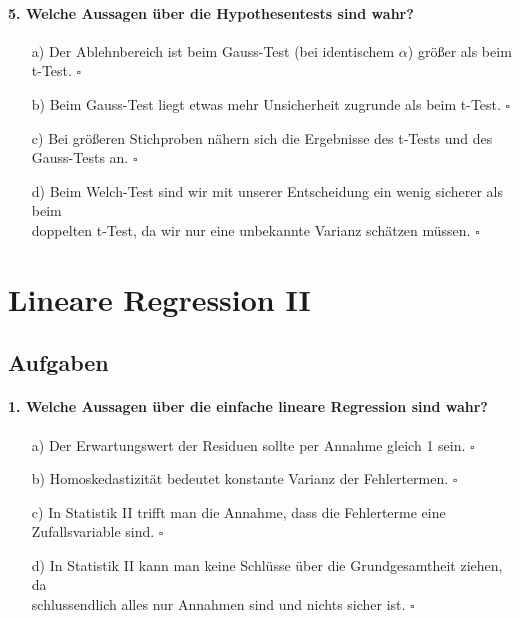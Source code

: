\documentclass[a4paper]{article}
\begin{document}
 \paragraph{5. Welche Aussagen über die Hypothesentests sind wahr?} \begin{itemize}
    \item[a)] Der Ablehnbereich ist beim Gauss-Test (bei identischem $\alpha$) größer als beim t-Test. \hfill $\square$
    \item[b)] Beim Gauss-Test liegt etwas mehr Unsicherheit zugrunde als beim t-Test. \hfill $\square$
    \item[c)] Bei größeren Stichproben nähern sich die Ergebnisse des t-Tests und des Gauss-Tests an. \hfill $\square$
    \item[d)] Beim Welch-Test sind wir mit unserer Entscheidung ein wenig sicherer als beim \\doppelten t-Test, da wir nur eine unbekannte Varianz schätzen müssen. \hfill $\square$
 \end{itemize}  


\clearpage


\section{Lineare Regression II}\label{chap:mult-reg}

\subsection{Aufgaben}
\paragraph{1. Welche Aussagen über die einfache lineare Regression sind wahr?}
\begin{itemize}
    \item[a)] Der Erwartungswert der Residuen sollte per Annahme gleich 1 sein. \hfill $\square$
    \item[b)] Homoskedastizität bedeutet konstante Varianz der Fehlertermen. \hfill $\square$
    \item[c)] In Statistik II trifft man die Annahme, dass die Fehlerterme eine Zufallsvariable sind. \hfill $\square$
    \item[d)] In Statistik II kann man keine Schlüsse über die Grundgesamtheit ziehen, da\\ schlussendlich alles nur Annahmen sind und nichts sicher ist. \hfill $\square$
\end{itemize}
\end{document}

